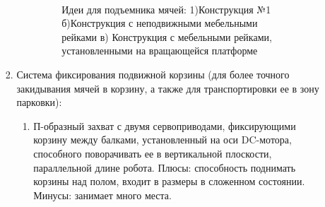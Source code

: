 \begin{enumerate}
\begin{enumerate}
\begin{enumerate}
\begin{enumerate}
	      \begin{figure}[H]
	      	\begin{minipage}[h]{0.2\linewidth}
	      		\center  
	      	\end{minipage}
	      	\begin{minipage}[h]{0.6\linewidth}
	      		\caption{Идеи для подъемника мячей: 1)Конструкция №1 б)Конструкция с неподвижными мебельными рейками в) Конструкция с мебельными рейками, установленными на вращающейся платформе}
	      	\end{minipage}
	      \end{figure}
	      
	    \end{enumerate}
	    
	    \item Система фиксирования подвижной корзины (для более точного закидывания мячей в корзину, а также для транспортировки ее в зону парковки):
	    \begin{enumerate}
	      \item П-образный захват с двумя сервоприводами, фиксирующими корзину между балками, установленный на оси DC-мотора, способного поворачивать ее в вертикальной плоскости, параллельной длине робота. Плюсы: способность поднимать корзины над полом, входит в размеры в сложенном состоянии. Минусы: занимает много места.
	      

\end{enumerate}
\end{enumerate}
\end{enumerate}
\end{enumerate}
